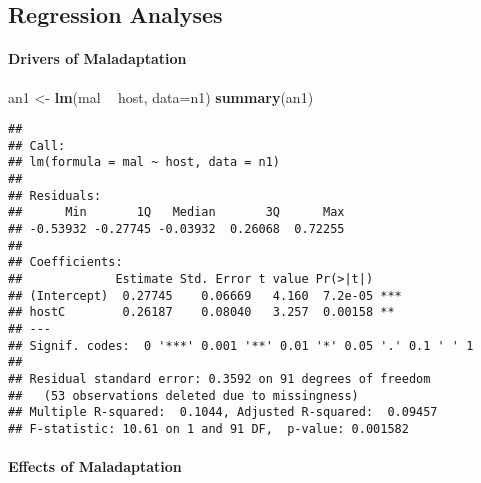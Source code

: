 \documentclass[]{article}
\newenvironment{Shaded}{\begin{snugshade}}{\end{snugshade}}
\newcommand{\KeywordTok}[1]{\textcolor[rgb]{0.13,0.29,0.53}{\textbf{#1}}}
\newcommand{\DataTypeTok}[1]{\textcolor[rgb]{0.13,0.29,0.53}{#1}}
\newcommand{\StringTok}[1]{\textcolor[rgb]{0.31,0.60,0.02}{#1}}
\newcommand{\CommentTok}[1]{\textcolor[rgb]{0.56,0.35,0.01}{\textit{#1}}}
\newcommand{\OperatorTok}[1]{\textcolor[rgb]{0.81,0.36,0.00}{\textbf{#1}}}
\newcommand{\NormalTok}[1]{#1}
\let\oldparagraph\paragraph
\renewcommand{\paragraph}[1]{\oldparagraph{#1}\mbox{}}
\begin{document}
\begin{Shaded}
\end{Shaded}

\subsection{Regression Analyses}\label{regression-analyses}

\paragraph{Drivers of Maladaptation}\label{drivers-of-maladaptation}

\begin{Shaded}
\begin{Highlighting}[]
\NormalTok{an1 <-}\StringTok{ }\KeywordTok{lm}\NormalTok{(mal }\OperatorTok{~}\StringTok{ }\NormalTok{host, }\DataTypeTok{data=}\NormalTok{n1)}
\KeywordTok{summary}\NormalTok{(an1)}
\end{Highlighting}
\end{Shaded}

\begin{verbatim}
## 
## Call:
## lm(formula = mal ~ host, data = n1)
## 
## Residuals:
##      Min       1Q   Median       3Q      Max 
## -0.53932 -0.27745 -0.03932  0.26068  0.72255 
## 
## Coefficients:
##             Estimate Std. Error t value Pr(>|t|)    
## (Intercept)  0.27745    0.06669   4.160  7.2e-05 ***
## hostC        0.26187    0.08040   3.257  0.00158 ** 
## ---
## Signif. codes:  0 '***' 0.001 '**' 0.01 '*' 0.05 '.' 0.1 ' ' 1
## 
## Residual standard error: 0.3592 on 91 degrees of freedom
##   (53 observations deleted due to missingness)
## Multiple R-squared:  0.1044, Adjusted R-squared:  0.09457 
## F-statistic: 10.61 on 1 and 91 DF,  p-value: 0.001582
\end{verbatim}

\paragraph{Effects of Maladaptation}\label{effects-of-maladaptation}
\end{document}
